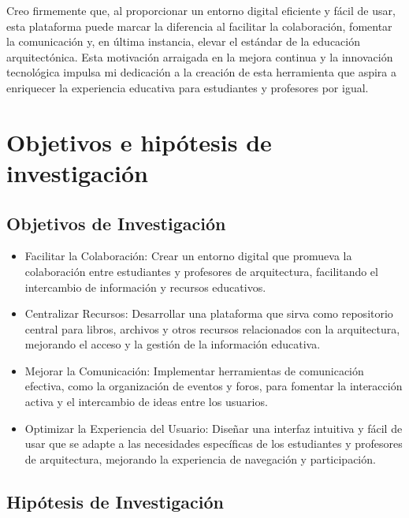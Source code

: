 \documentclass[a4paper, 12pt]{book}
\begin{document}
Creo firmemente que, al proporcionar un entorno digital eficiente y fácil de usar, esta plataforma puede marcar la diferencia al facilitar la colaboración, fomentar la comunicación y, en última instancia, elevar el estándar de la educación arquitectónica. Esta motivación arraigada en la mejora continua y la innovación tecnológica impulsa mi dedicación a la creación de esta herramienta que aspira a enriquecer la experiencia educativa para estudiantes y profesores por igual.
\section{Objetivos e hipótesis de investigación}
\label{sec:seccion}

\subsection{Objetivos de Investigación}
\label{subsec:Objetivos de Investigación}

\begin{itemize}
  \item Facilitar la Colaboración: Crear un entorno digital que promueva la colaboración entre estudiantes y profesores de arquitectura, facilitando el intercambio de información y recursos educativos.
  \item Centralizar Recursos: Desarrollar una plataforma que sirva como repositorio central para libros, archivos y otros recursos relacionados con la arquitectura, mejorando el acceso y la gestión de la información educativa.
  \item Mejorar la Comunicación: Implementar herramientas de comunicación efectiva, como la organización de eventos y foros, para fomentar la interacción activa y el intercambio de ideas entre los usuarios.
  \item Optimizar la Experiencia del Usuario: Diseñar una interfaz intuitiva y fácil de usar que se adapte a las necesidades específicas de los estudiantes y profesores de arquitectura, mejorando la experiencia de navegación y participación.
\end{itemize}

\subsection{Hipótesis de Investigación}
\label{subsec:Hipótesis de Investigación}
\end{document}

